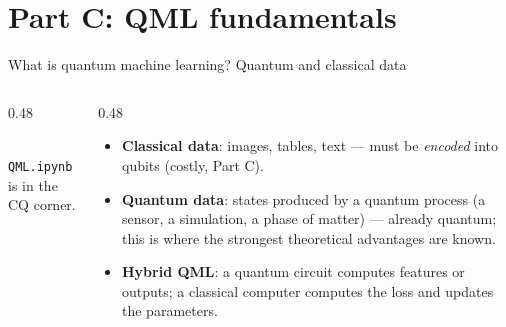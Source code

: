 \documentclass[aspectratio=169,11pt]{beamer}
\newcommand{\key}[1]{{\color{qdark}\textbf{#1}}}
\begin{document}
\section{Part C: QML fundamentals}
\begin{frame}[label=fQML]{What is quantum machine learning? Quantum and classical data}
  \begin{columns}[T]
    \begin{column}{0.48\textwidth}
      \centering
      \\
      {\scriptsize \texttt{QML.ipynb} is in the CQ corner.}
    \end{column}
    \begin{column}{0.48\textwidth}
      \small
      \begin{itemize}\itemsep2pt
        \item \key{Classical data}: images, tables, text --- must be \emph{encoded} into qubits (costly, Part C).
        \item \key{Quantum data}: states produced by a quantum process (a sensor, a simulation, a phase of matter) --- already
          quantum; this is where the strongest theoretical advantages are known.
        \item \key{Hybrid QML}: a quantum circuit computes features or outputs; a classical computer computes the loss and updates the parameters.
      \end{itemize}
    \end{column}
  \end{columns}
\end{frame}
\end{document}
